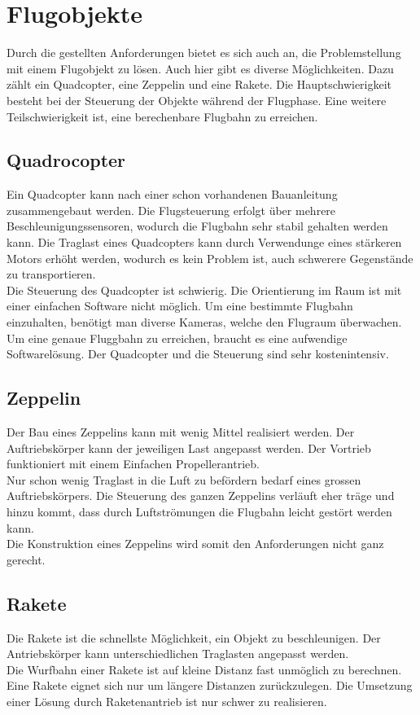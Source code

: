﻿\section{Flugobjekte}
Durch die gestellten Anforderungen bietet es sich auch an, die Problemstellung mit einem Flugobjekt zu lösen. Auch hier gibt es diverse Möglichkeiten. Dazu zählt ein Quadcopter, eine Zeppelin und eine Rakete. Die Hauptschwierigkeit besteht bei der Steuerung der Objekte während der Flugphase. Eine weitere Teilschwierigkeit ist, eine berechenbare Flugbahn zu erreichen. 

\subsection{Quadrocopter}
Ein Quadcopter kann nach einer schon vorhandenen Bauanleitung zusammengebaut werden. Die Flugsteuerung erfolgt über mehrere Beschleunigungssensoren, wodurch die Flugbahn sehr stabil gehalten werden kann. Die Traglast eines Quadcopters kann durch Verwendunge eines stärkeren Motors erhöht werden, wodurch es kein Problem ist, auch schwerere Gegenstände zu transportieren.\\
Die Steuerung des Quadcopter ist schwierig. Die Orientierung im Raum ist mit einer einfachen Software nicht möglich. Um eine bestimmte Flugbahn einzuhalten, benötigt man diverse Kameras, welche den Flugraum überwachen. Um eine genaue Fluggbahn zu erreichen, braucht es eine aufwendige Softwarelösung. Der Quadcopter und die Steuerung sind sehr kostenintensiv.

\subsection{Zeppelin}
Der Bau eines Zeppelins kann mit wenig Mittel realisiert werden. Der Auftriebskörper kann der jeweiligen Last angepasst werden. Der Vortrieb funktioniert mit einem Einfachen Propellerantrieb. \\
Nur schon wenig Traglast in die Luft zu befördern bedarf eines grossen Auftriebskörpers. Die Steuerung des ganzen Zeppelins verläuft eher träge und hinzu kommt, dass durch Luftströmungen die Flugbahn leicht gestört werden kann. \\
Die Konstruktion eines Zeppelins wird somit den Anforderungen nicht ganz gerecht.

\subsection{Rakete}
Die Rakete ist die schnellste Möglichkeit, ein Objekt zu beschleunigen. Der Antriebskörper kann unterschiedlichen Traglasten angepasst werden.\\
Die Wurfbahn einer Rakete ist auf kleine Distanz fast unmöglich zu berechnen. Eine Rakete eignet sich nur um längere Distanzen zurückzulegen. Die Umsetzung einer Lösung durch Raketenantrieb ist nur schwer zu realisieren.
